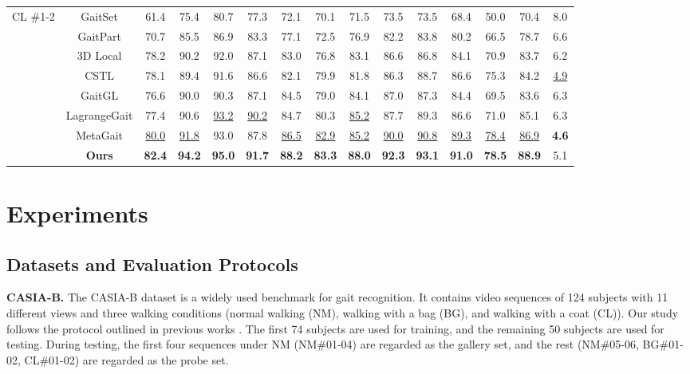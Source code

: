 \documentclass[10pt,twocolumn,letterpaper]{article}
\begin{document}
\begin{table}[tbp]
{\begin{tabular}{c|c|ccccccccccc|c|c}
    \multirow{4}[12]{*}{CL \#1-2} & GaitSet \cite{chao2019gaitset} & 61.4  & 75.4  & 80.7  & 77.3  & 72.1  & 70.1  & 71.5  & 73.5  & 73.5  & 68.4  & 50.0    & 70.4&8.0 \\
         & GaitPart \cite{fan2020gaitpart} & 70.7  & 85.5  & 86.9  & 83.3  & 77.1  & 72.5  & 76.9  & 82.2  & 83.8  & 80.2  & 66.5  & 78.7 &6.6\\
          & 3D Local \cite{huang20213d} & 78.2  & 90.2  & 92.0    & 87.1  & 83.0    & 76.8  & 83.1  & 86.6  & 86.8  & 84.1  & 70.9  & 83.7 &6.2\\
          & CSTL \cite{huang2021context}  & 78.1  & 89.4  & 91.6  & 86.6  & 82.1  & 79.9  & 81.8  & 86.3  & 88.7  & 86.6  & 75.3  & 84.2 &\underline{4.9}\\
          & GaitGL \cite{lin2021gait} & 76.6  & 90.0    & 90.3  & 87.1  & 84.5  & 79.0    & 84.1  & 87.0    & 87.3  & 84.4  & 69.5  & 83.6&6.3 \\
          & LagrangeGait \cite{chai2022lagrange} & 77.4  & 90.6  & \underline{93.2}  & \underline{90.2}  & 84.7  & 80.3  & \underline{85.2}  & 87.7  & 89.3  & 86.6  & 71.0    & 85.1 &6.3\\
          & MetaGait \cite{dou2022metagait} & \underline{80.0}  & \underline{91.8}  & 93.0  & 87.8  & \underline{86.5}  & \underline{82.9}  & \underline{85.2}  & \underline{90.0}  & \underline{90.8}  & \underline{89.3}  & \underline{78.4}    & \underline{86.9} &\textbf{4.6}\\
\cline{2-15}          & \textbf{Ours} & \textbf{82.4}  & \textbf{94.2}  & \textbf{95.0}  & \textbf{91.7}  & \textbf{88.2}  & \textbf{83.3}  & \textbf{88.0}  & \textbf{92.3}  & \textbf{93.1}  & \textbf{91.0}  & \textbf{78.5}  & \textbf{88.9} &5.1\\
    \bottomrule
    \end{tabular}%
    }
  \label{tab:sota-cb}%
\end{table}%
\section{Experiments}
\label{sec:exper}
\subsection{Datasets and Evaluation Protocols}
\label{sec:dataset}
\noindent\textbf{CASIA-B.} The CASIA-B \cite{yu2006framework} dataset is a widely used benchmark for gait recognition. It contains video sequences of 124 subjects with 11 different views and three walking conditions (normal walking (NM), walking with a bag (BG), and walking with a coat (CL)). Our study follows the protocol outlined in previous works \cite{chao2019gaitset,fan2020gaitpart,lin2021gait,lin2021gaitmask,huang2021context,huang20213d}. The first 74 subjects are used for training, and the remaining 50 subjects are used for testing. During testing, the first four sequences under NM (NM\#01-04) are regarded as the gallery set, and the rest  (NM\#05-06, BG\#01-02, CL\#01-02) are regarded as the probe set.
\end{document}
